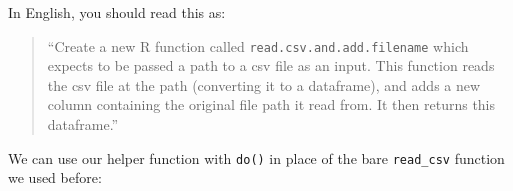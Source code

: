 \documentclass[]{article}
\newenvironment{Shaded}{\begin{snugshade}}{\end{snugshade}}
\newcommand{\KeywordTok}[1]{\textcolor[rgb]{0.13,0.29,0.53}{\textbf{#1}}}
\newcommand{\DecValTok}[1]{\textcolor[rgb]{0.00,0.00,0.81}{#1}}
\newcommand{\StringTok}[1]{\textcolor[rgb]{0.31,0.60,0.02}{#1}}
\newcommand{\OperatorTok}[1]{\textcolor[rgb]{0.81,0.36,0.00}{\textbf{#1}}}
\newcommand{\NormalTok}[1]{#1}
\theoremstyle{definition}
\theoremstyle{definition}
\theoremstyle{definition}
\theoremstyle{remark}
\begin{document}
In English, you should read this as:

\begin{quote}
``Create a new R function called \texttt{read.csv.and.add.filename}
which expects to be passed a path to a csv file as an input. This
function reads the csv file at the path (converting it to a dataframe),
and adds a new column containing the original file path it read from. It
then returns this dataframe.''
\end{quote}

We can use our helper function with \texttt{do()} in place of the bare
\texttt{read\_csv} function we used before:

\begin{Shaded}
\end{Shaded}
\end{document}
